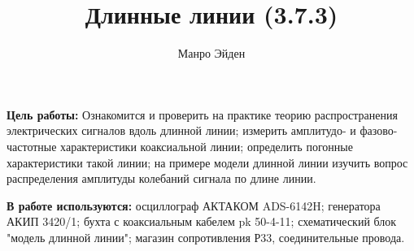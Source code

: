 \documentclass[a4paper, 12pt]{article}
\title{\textbf{Длинные линии (3.7.3)}}
\author{Манро Эйден}
\date{}
\begin{document}
\maketitle

\noindent \textbf{Цель работы:} Ознакомится и проверить на практике теорию распространения
электрических сигналов вдоль длинной линии; измерить амплитудо- и фазово-частотные
характеристики коаксиальной линии; определить погонные характеристики такой
линии; на примере модели длинной линии изучить вопрос распределения амплитуды
колебаний сигнала по длине линии.

\bigskip

\noindent \textbf{В работе используются:} осциллограф АКТАКОМ ADS-6142H; генератора АКИП 3420/1; бухта с коаксиальным кабелем pk 50-4-11;
	схематический блок "модель длинной линии"; магазин сопротивления Р33, соединительные провода.
\end{document}
